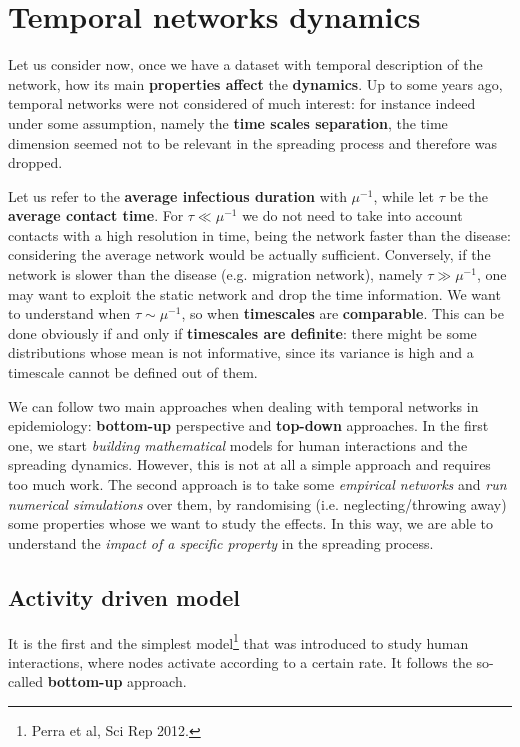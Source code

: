 \documentclass[../main/main.tex]{subfiles}
\begin{document}
\section{Temporal networks dynamics}

Let us consider now, once we have a dataset with temporal description of the network, how its main \textbf{properties affect} the \textbf{dynamics}. Up to some years ago, temporal networks were not considered of much interest: for instance indeed under some assumption, namely the \textbf{time scales separation}, the time dimension seemed not to be relevant in the spreading process and therefore was dropped.

Let us refer to the \textbf{average infectious duration} with $\mu^{-1}$, while let $\tau$ be the \textbf{average contact time}. For $\tau \ll \mu^{-1}$ we do not need to take into account contacts with a high resolution in time, being the network faster than the disease: considering the average network would be actually sufficient. Conversely, if the network is slower than the disease (e.g. migration network), namely $ \tau \gg \mu^{-1} $, one may want to exploit the static network and drop the time information. We want to understand when $\tau \sim \mu^{-1}$, so when \textbf{timescales} are \textbf{comparable}. This can be done obviously if and only if \textbf{timescales are definite}: there might be some distributions whose mean is not informative, since its variance is high and a timescale cannot be defined out of them.

We can follow two main approaches when dealing with temporal networks in epidemiology: \textbf{bottom-up} perspective and \textbf{top-down} approaches.
In the first one, we start \textit{building mathematical} models for human interactions and the spreading dynamics. However, this is not at all a simple approach and requires too much work. The second approach is to take some \textit{empirical networks} and \textit{run numerical simulations} over them, by randomising (i.e. neglecting/throwing away) some properties whose we want to study the effects. In this way, we are able to understand the \textit{impact of a specific property} in the spreading process.



\subsection{Activity driven model}

It is the first and the simplest model\footnote{Perra et al, Sci Rep 2012.} that was introduced to study human interactions, where nodes activate according to a certain rate. It follows the so-called \textbf{bottom-up} approach.
\end{document}
